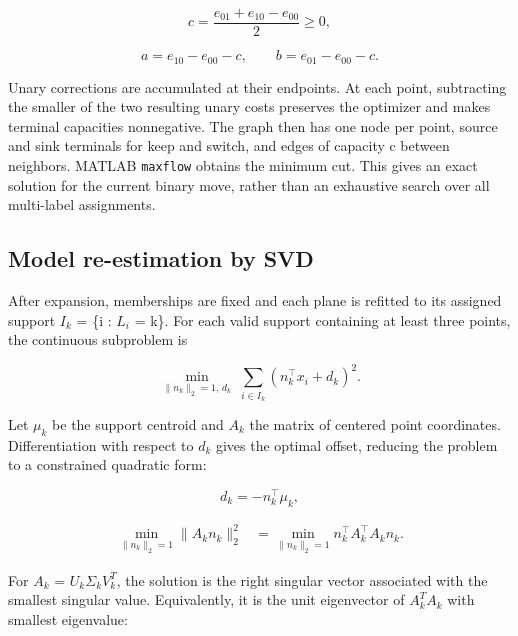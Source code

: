 \begin{equation}
c=\frac{e_{01}+e_{10}-e_{00}}{2}\geq0,
\label{eq:31}
\end{equation}

\begin{equation}
a=e_{10}-e_{00}-c,\qquad b=e_{01}-e_{00}-c.
\label{eq:32}
\end{equation}

Unary corrections are accumulated at their endpoints. At each point, subtracting the smaller of the two resulting unary costs preserves the optimizer and makes terminal capacities nonnegative. The graph then has one node per point, source and sink terminals for keep and switch, and edges of capacity c between neighbors. MATLAB \texttt{maxflow} obtains the minimum cut. This gives an exact solution for the current binary move, rather than an exhaustive search over all multi-label assignments.

\subsection{Model re-estimation by SVD}\label{model-re-estimation-by-svd}

After expansion, memberships are fixed and each plane is refitted to its assigned support \(I_{k}\) = \{i : \(L_{i}\) = k\}. For each valid support containing at least three points, the continuous subproblem is

\begin{equation}
\min_{\|n_k\|_2=1,\,d_k}\;\sum_{i\in I_k}(n_k^\top x_i+d_k)^2.
\label{eq:33}
\end{equation}

Let \(\mu_{k}\) be the support centroid and \(A_{k}\) the matrix of centered point coordinates. Differentiation with respect to \(d_{k}\) gives the optimal offset, reducing the problem to a constrained quadratic form:

\begin{equation}
d_k=-n_k^\top\mu_k,
\label{eq:34}
\end{equation}

\begin{equation}
\begin{aligned}\min_{\|n_k\|_2=1}\|A_kn_k\|_2^2&=\min_{\|n_k\|_2=1}n_k^\top A_k^\top A_kn_k.\end{aligned}
\label{eq:35}
\end{equation}

For \(A_{k}\) = \(U_{k}\)\(\Sigma_{k}\)\(V_{k}^{T}\), the solution is the right singular vector associated with the smallest singular value. Equivalently, it is the unit eigenvector of \(A_{k}^{T}\)\(A_{k}\) with smallest eigenvalue:

